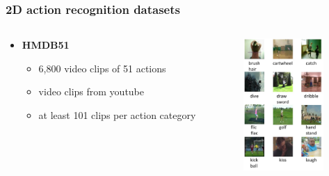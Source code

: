 \documentclass[9pt]{beamer}
\newenvironment{myframe}[1][]{%
\begin{frame}%
\frametitle{#1}
\setcounter{footnote}{0}


}{%
\end{frame}%
}
\begin{document}
\begin{myframe}[2D action recognition datasets]
  \begin{columns}[T]
      \begin{column}{.48\textwidth}
          \vspace{50px}
          \begin{itemize}
              \item \textbf{HMDB51\footnotemark}
              \begin{itemize}
                  \item 6,800 video clips of 51 actions
                  \item video clips from youtube
                  \item at least 101 clips per action category
              \end{itemize}
          \end{itemize}
      \end{column}
      \begin{column}{.48\textwidth}
          \begin{figure}
              \includegraphics[height=190px]{hmdb-example.png}
          \end{figure}
      \end{column}
  \end{columns}
\end{myframe}
\end{document}
